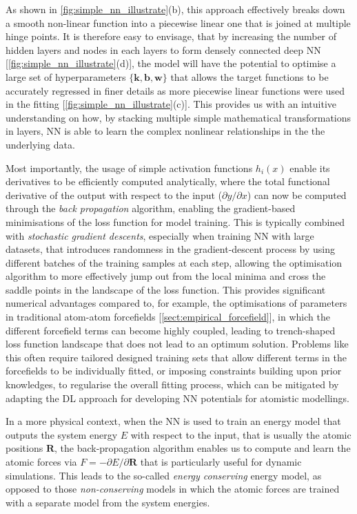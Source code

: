 As shown in \cref{fig:simple_nn_illustrate}(b), this approach effectively breaks down a smooth non-linear function into a piecewise linear one that is joined at multiple hinge points. It is therefore easy to envisage, that by increasing the number of hidden layers and nodes in each layers to form densely connected deep NN [\cref{fig:simple_nn_illustrate}(d)], the model will have the potential to optimise a large set of hyperparameters $\{\bm{k},\bm{b},\bm{w}\}$ that allows the target functions to be accurately regressed in finer details as more piecewise linear functions were used in the fitting    [\cref{fig:simple_nn_illustrate}(c)]. This provides us with an intuitive understanding on how, by stacking multiple simple mathematical transformations in layers, NN is able to learn the complex nonlinear relationships in the the underlying data. 

Most importantly, the usage of simple activation functions $h_i(x)$ enable its derivatives to be efficiently computed analytically, where the total functional derivative of the output with respect to the input  ($\partial y/\partial x$) can now be computed through the \emph{back propagation} algorithm, enabling the gradient-based minimisations of the loss function for model training. This is typically combined with \emph{stochastic gradient descents},\cite{prince2023understanding} especially when training NN with large datasets, that introduces randomness in the gradient-descent process by using different batches of the training samples at each step, allowing the optimisation algorithm to more effectively jump out from the local minima and cross the saddle points in the landscape of the loss function.  This provides significant numerical advantages compared to, for example, the optimisations of parameters in traditional atom-atom forcefields [\cref{sect:empirical_forcefield}], in which the different forcefield terms can become highly coupled, leading to trench-shaped loss function landscape that does not lead to an optimum solution. Problems like this often require tailored designed training sets that allow different terms in the forcefields to be individually fitted, or imposing  constraints building upon prior knowledges, to regularise the overall fitting process, which can be mitigated by adapting the DL approach for developing NN potentials for atomistic modellings.

In a more physical context, when the NN is used to train an energy model that outputs the system energy $E$ with respect to the input, that is usually  the atomic positions $\bm{R}$, the back-propagation algorithm enables us to compute and learn the atomic forces via $F=-\partial E/\partial \bm{R}$ that is particularly useful for dynamic simulations. This leads to the so-called \emph{energy conserving} energy model, as opposed to those \emph{non-conserving} models in which the atomic forces are trained with a separate model from the system energies.
 
